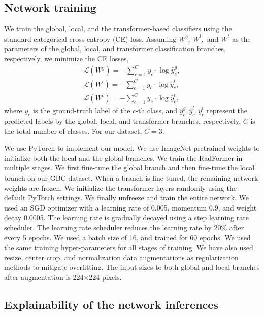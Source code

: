 \documentclass[twocolumn,final]{elsarticle}
\def\myarch{RadFormer\xspace}
\begin{document}
\subsection{Network training}
We train the global, local, and the transformer-based classifiers using the standard categorical cross-entropy (CE) loss. Assuming $W^g,~W^l,$ and $W^t$ as the parameters of the global, local, and transformer classification branches, respectively, we minimize the CE losses,
\begin{align}
    \mathcal{L}(W^g) = - \sum_{c=1}^C y_c \cdot \log{\hat{y}_c^g} ,\\
    \mathcal{L}(W^l) = - \sum_{c=1}^C y_c \cdot \log{\hat{y}_c^l} ,\\
    \mathcal{L}(W^t) = - \sum_{c=1}^C y_c \cdot \log{\hat{y}_c^t} ,
\end{align}
where $y_c$ is the ground-truth label of the $c$-th class, and $\hat{y}_c^g, \hat{y}_c^l, \hat{y}_c^t$ represent the predicted labels by the global, local, and transformer branches, respectively. $C$ is the total number of classes. For our dataset, $C=3$.
%
\par We use PyTorch \citep{pytorch} to implement our model. We use ImageNet \citep{imagenet} pretrained weights to initialize both the local and the global branches. We train the \myarch in multiple stages. We first fine-tune the global branch and then fine-tune the local branch on our GBC dataset. When a branch is fine-tuned, the remaining network weights are frozen. We initialize the transformer layers randomly using the default PyTorch settings. We finally unfreeze and train the entire network. We used an SGD optimizer with a learning rate of 0.005, momentum 0.9, and weight decay 0.0005. The learning rate is gradually decayed using a step learning rate scheduler. The learning rate scheduler reduces the learning rate by 20\% after every 5 epochs. We used a batch size of 16, and trained for 60 epochs. We used the same training hyper-parameters for all stages of training. We have also used resize, center crop, and normalization data augmentations as regularization methods to mitigate overfitting. The input sizes to both global and local branches after augmentation is 224$\times$224 pixels.

\subsection{Explainability of the network inferences}
\end{document}
